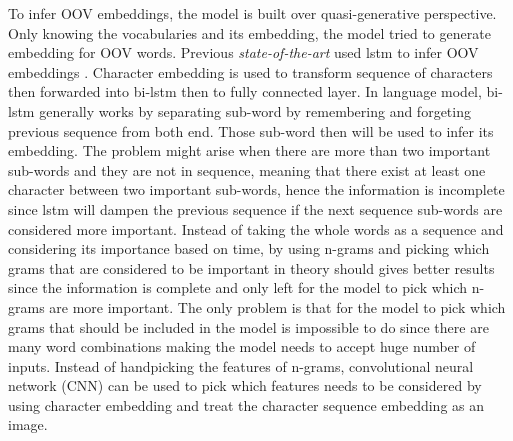 To infer OOV embeddings, the model is built over quasi-generative
perspective. Only knowing the vocabularies and its embedding, the
model tried to generate embedding for OOV words. Previous
\textit{state-of-the-art} used lstm to infer OOV embeddings
\citep{mimicking2017Pinter}. Character embedding is used to transform
sequence of characters then forwarded into bi-lstm then to fully
connected layer. In language model, bi-lstm generally works by
separating sub-word by remembering and forgeting previous sequence
from both end. Those sub-word then will be used to infer its
embedding. The problem might arise when there are more than two
important sub-words and they are not in sequence, meaning that there
exist at least one character between two important sub-words, hence
the information is incomplete since lstm will dampen the previous
sequence if the next sequence sub-words are considered more important.
Instead of taking the whole words as a sequence and considering its
importance based on time, by using n-grams and picking which grams
that are considered to be important in theory should gives better
results since the information is complete and only left for the model
to pick which n-grams are more important. The only problem is that for
the model to pick which grams that should be included in the model is
impossible to do since there are many word combinations making the
model needs to accept huge number of inputs. Instead of handpicking
the features of n-grams, convolutional neural network (CNN) can be used to
pick which features needs to be considered by using character
embedding and treat the character sequence embedding as an image.







